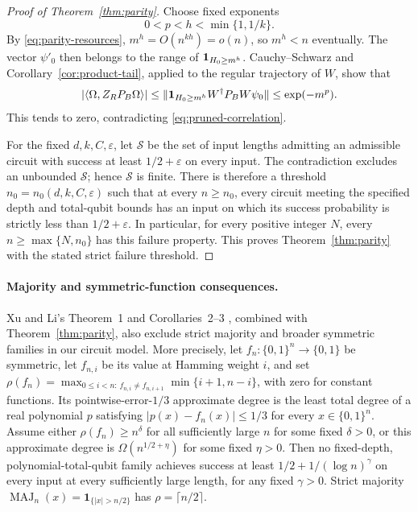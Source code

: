 \begin{proof}[Proof of Theorem~\ref{thm:parity}]
Choose fixed exponents
\[
 0<p<h<\min\{1,1/k\}.
\]
By \eqref{eq:parity-resources}, $m^h=O(n^{kh})=o(n)$, so
$m^h<n$ eventually.  The vector $\psi'_0$ then belongs to the range
of $\mathbf 1_{H_0\ge m^h}$.  Cauchy--Schwarz and
Corollary~\ref{cor:product-tail}, applied to the regular trajectory
of $W$, show that
\[
 \left|\langle \Omega,Z_RP_B\Omega\rangle\right|
 \le\lVert\mathbf 1_{H_0\ge m^h}W^{\dagger}P_BW\psi_0\rVert
 \le\exp(-m^p).
\]
This tends to zero, contradicting \eqref{eq:pruned-correlation}.

For the fixed $d,k,C,\varepsilon$, let $\mathcal S$ be the set of input lengths
admitting an admissible circuit with success at least $1/2+\varepsilon$ on every
input.  The contradiction excludes an unbounded $\mathcal S$;
hence $\mathcal S$ is finite.  There is therefore a threshold
$n_0=n_0(d,k,C,\varepsilon)$ such that at every $n\ge n_0$, every circuit meeting
the specified depth and total-qubit bounds has an input on which
its success probability is strictly less than $1/2+\varepsilon$. In particular,
for every positive integer $N$, every $n\ge\max\{N,n_0\}$ has
this failure property.  This proves
Theorem~\ref{thm:parity} with the stated strict failure threshold.
\end{proof}

\paragraph{Majority and symmetric-function consequences.}
Xu and Li's Theorem~1 and Corollaries~2--3
\citep{XuLi2026Fanout}, combined with Theorem~\ref{thm:parity}, also
exclude strict majority and broader symmetric families in our circuit
model. More precisely, let \(f_n:\{0,1\}^n\to\{0,1\}\) be symmetric, let \(f_{n,i}\) be its
value at Hamming weight \(i\), and set
\(\rho(f_n)=\max_{0\le i<n:\,f_{n,i}\ne f_{n,i+1}}\min\{i+1,n-i\}\), with zero
for constant functions. Its pointwise-error-\(1/3\) approximate degree is
the least total degree of a real polynomial \(p\) satisfying
\(\lvert p(x)-f_n(x)\rvert\le1/3\) for every \(x\in\{0,1\}^n\).
Assume either \(\rho(f_n)\ge n^\delta\) for all sufficiently large \(n\)
for some fixed \(\delta>0\), or this approximate degree is
\(\Omega(n^{1/2+\eta})\) for some fixed \(\eta>0\). Then no
fixed-depth, polynomial-total-qubit family achieves success at least
\(1/2+1/(\log n)^\gamma\) on every input at every sufficiently large
length, for any fixed \(\gamma>0\). Strict majority
\(\operatorname{MAJ}_n(x)=\mathbf1_{\{|x|>n/2\}}\) has
\(\rho=\lceil n/2\rceil\).

